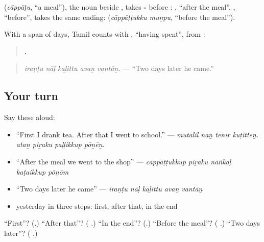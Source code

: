 \textbf{} (\emph{cāppāṭu}, \textquotedblleft{}a meal\textquotedblright{}), the noun beside \textbf{}, takes \textbf{-} before \textbf{}: \textbf{ }, \textquotedblleft{}after the meal\textquotedblright{}. \textbf{}, \textquotedblleft{}before\textquotedblright{}, takes the same ending: \textbf{ } (\emph{cāppāṭṭukku muṉpu}, \textquotedblleft{}before the meal\textquotedblright{}).

With a span of days, Tamil counts with \textbf{}, \textquotedblleft{}having spent\textquotedblright{}, from \textbf{}:

\begin{quote}
\textbf{    .}
\end{quote}

\begin{quote}
\emph{iraṇṭu nāḷ kaḻittu avaṉ vantāṉ.} — \textquotedblleft{}Two days later he came.\textquotedblright{}
\end{quote}

\subsection*{Your turn}
Say these aloud:

\begin{itemize}
\raggedright
  \item \textquotedblleft{}First I drank tea. After that I went to school.\textquotedblright{} — \emph{mutalil nāṉ tēnīr kuṭittēṉ. ataṉ piṟaku paḷḷikkup pōṉēṉ.}
  \item \textquotedblleft{}After the meal we went to the shop\textquotedblright{} — \emph{cāppāṭṭukkup piṟaku nāṅkaḷ kaṭaikkup pōṉōm}
  \item \textquotedblleft{}Two days later he came\textquotedblright{} — \emph{iraṇṭu nāḷ kaḻittu avaṉ vantāṉ}
  \item yesterday in three steps: first, after that, in the end
\end{itemize}

\begin{tcolorbox}[breakable,colback=teal!4,colframe=teal!35!black,title={Before you move on}]
\textquotedblleft{}First\textquotedblright{}? (\textbf{}.) \textquotedblleft{}After that\textquotedblright{}? (\textbf{ }.) \textquotedblleft{}In the end\textquotedblright{}? (\textbf{}.) \textquotedblleft{}Before the meal\textquotedblright{}? (\textbf{ }.) \textquotedblleft{}Two days later\textquotedblright{}? (\textbf{  }.)
\end{tcolorbox}
